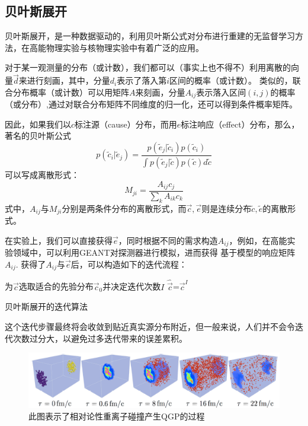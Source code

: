 \documentclass[aps,pre,12pt,preprint,onecolumn,showpacs,showkeys]{revtex4-1}
\begin{document}
\subsection{贝叶斯展开}
贝叶斯展开，是一种数据驱动的，利用贝叶斯公式对分布进行重建的无监督学习方法，在高能物理实验与核物理实验中有着广泛的应用\cite{PhysRevC.88.014907,DAGOSTINI1995487}。\par
对于某一观测量的分布（或计数），我们都可以（事实上也不得不）利用离散的向量$\vec{d}$来进行刻画，其中，分量$d_i$表示了落入第$i$区间的概率（或计数）。
类似的，联合分布概率（或计数）可以用矩阵$A$来刻画，分量$A_{ij}$表示落入区间$(i,j)$的概率（或分布）,通过对联合分布矩阵不同维度的归一化，还可以得到条件概率矩阵。\par
因此，如果我们以$c$标注源（cause）分布，而用$e$标注响应（effect）分布，那么，著名的贝叶斯公式
\begin{equation}p(\tilde{c}_i|\tilde{e}_j)=\frac{p(\tilde{e}_j|\tilde{c}_i)p(\tilde{c}_i)}{\int p(\tilde{e}_j|\tilde{c})p(\tilde{c})d\tilde{c}}\end{equation}
可以写成离散形式：
\begin{equation}M_{ji}=\frac{A_{ij}c_j}{\sum_{k}A_{ik}c_k}\end{equation}
式中，$A_{ij}$与$M_{ji}$分别是两条件分布的离散形式，而$\vec{c},\vec{e}$则是连续分布$\tilde{c},\tilde{e}$的离散形式。\par
在实验上，我们可以直接获得$\vec{e}$，同时根据不同的需求构造$A_{ij}$，例如，在高能实验领域中，可以利用GEANT对探测器进行模拟，进而获得
基于模型的响应矩阵$A_{ij}$.
获得了$A_{ij}$与$\vec{e}$后，可以构造如下的迭代流程：\par
\begin{center}
    \begin{algorithm}
    \SetAlgoLined
    为$\vec{c}$选取适合的先验分布$\vec{c}_0$并决定迭代次数$I$\;
    $\hat{\vec{c}}$=$\vec{c}^{I}$\;
    \caption{贝叶斯展开的迭代算法}
\end{algorithm}
    \end{center}
这个迭代步骤最终将会收敛到贴近真实源分布附近\cite{DAGOSTINI1995487}，但一般来说，人们并不会令迭代次数过分大，以避免过多迭代带来的误差累积。
\begin{figure}[htbp]
\centering
\includegraphics[width=140mm]{QGP}
\caption{\label{fig:QGP}%
此图表示了相对论性重离子碰撞产生QGP的过程}
\end{figure}
\end{document}

